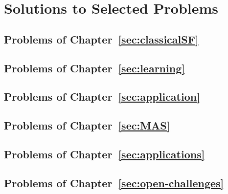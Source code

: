 \chapter*{Solutions to Selected Problems}

\section*{Problems of Chapter~\ref{sec:classicalSF}}
\section*{Problems of Chapter~\ref{sec:learning}}
\section*{Problems of Chapter~\ref{sec:application}}
\section*{Problems of Chapter~\ref{sec:MAS}}
\section*{Problems of Chapter~\ref{sec:applications}}
\section*{Problems of Chapter~\ref{sec:open-challenges}}
